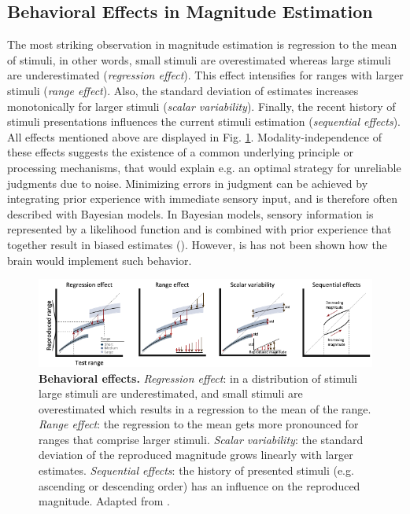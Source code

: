 \documentclass[10pt]{article}
\begin{document}


\subsection{Behavioral Effects in Magnitude Estimation}
The most striking observation in magnitude estimation is regression to the mean of stimuli, in other words, small stimuli are overestimated whereas large stimuli are underestimated (\textit{regression effect}). 
This effect intensifies for ranges with larger stimuli (\textit{range effect}).
Also, the standard deviation of estimates increases monotonically for larger stimuli (\textit{scalar variability}). 
Finally, the recent history of stimuli presentations influences the current stimuli estimation (\textit{sequential effects}).
All effects mentioned above are displayed in Fig. \ref{fig:behavioraleffects}. 
Modality-independence of these effects suggests the existence of a common underlying principle or processing mechanisms, that would explain e.g. an optimal strategy for unreliable judgments due to noise.
Minimizing errors in judgment can be achieved by integrating prior experience with immediate sensory input, and is therefore often described with Bayesian models.
In Bayesian models, sensory information is represented by a likelihood function and is combined with prior experience that together result in biased estimates (\cite{Knill2004}).
However, is has not been shown how the brain would implement such behavior. 

\begin{figure}[ht]
	\centering
	\includegraphics[width=\textwidth]{figures/behavioural_effects_petzschner.pdf}
	\caption{\textbf{Behavioral effects.} 
	\textit{Regression effect}: in a distribution of stimuli large stimuli are underestimated, and small stimuli are overestimated which results in a regression to the mean of the range.
	\textit{Range effect}: the regression to the mean gets more pronounced for ranges that comprise larger stimuli. 
	\textit{Scalar variability}: the standard deviation of the reproduced magnitude grows linearly with larger estimates. 
	\textit{Sequential effects}: the history of presented stimuli (e.g. ascending or descending order) has an influence on the reproduced magnitude. 
	Adapted from \cite{Petzschner2015}.}
	\label{fig:behavioraleffects}
\end{figure}
\end{document}
